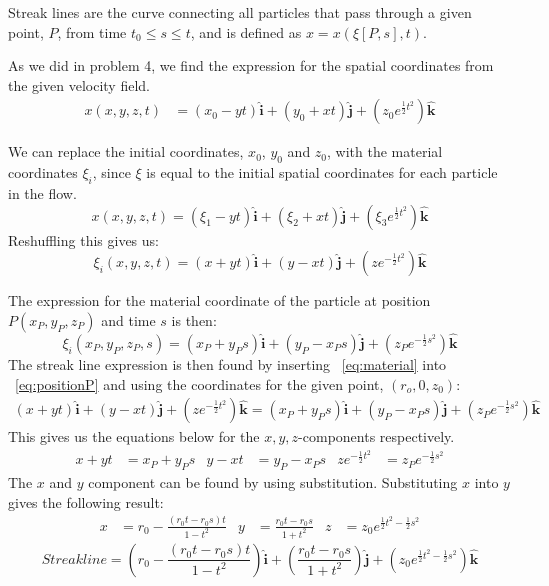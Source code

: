 \documentclass[11pt,a4paper,english]{article}
\numberwithin{equation}{section}
\let\oldhat\hat
\renewcommand{\hat}[1]{\mathbf{\oldhat{#1}}}
\begin{document}
Streak lines are the curve connecting all particles that pass through a given point, $P$, from time $t_0 \leq s \leq t$, and is defined as $x = x(\xi[P,s],t)$.

As we did in problem 4, we find the expression for the spatial coordinates from the given velocity field.
\begin{align*}
	x(x,y,z, t) &= (x_0-yt)\hat{i} + (y_0+xt)\hat{j} + (z_0e^{\frac{1}{2}t^2})\hat{k}
\end{align*}


We can replace the initial coordinates, $x_0$, $y_0$ and $z_0$, with the material coordinates $\xi_i$, since $\xi$ is equal to the initial spatial coordinates for each particle in the flow.
$$x(x,y,z, t) = (\xi_1-yt)\hat{i} + (\xi_2+xt)\hat{j} + (\xi_3e^{\frac{1}{2}t^2})\hat{k}$$
Reshuffling this gives us:
\begin{equation} \label{eq:material}
\xi_i(x,y,z,t) = (x+yt)\hat{i} + (y-xt)\hat{j} + (ze^{-\frac{1}{2}t^2})\hat{k}
\end{equation}

The expression for the material coordinate of the particle at position $P(x_P,y_P,z_P)$ and time $s$ is then:
\begin{equation} \label{eq:positionP}
\xi_i(x_P,y_P,z_P,s) = (x_P+y_Ps)\hat{i} + (y_P-x_Ps)\hat{j} + (z_Pe^{-\frac{1}{2}s^2})\hat{k}
\end{equation}
The streak line expression is then found by inserting ~\eqref{eq:material} into ~\eqref{eq:positionP} and using the coordinates for the given point, $(r_o, 0, z_0)$:
\begin{align*}
	(x+yt)\hat{i} + (y-xt)\hat{j} + (ze^{-\frac{1}{2}t^2})\hat{k}
		= 
	(x_P+y_Ps)\hat{i} + (y_P-x_Ps)\hat{j} + (z_Pe^{-\frac{1}{2}s^2})\hat{k}
\end{align*}
This gives us the equations below for the $x, y, z$-components respectively.
\begin{align*}
	x+yt &= x_P+y_Ps 			& 	
	y-xt &= y_P-x_Ps			&	
	ze^{-\frac{1}{2}t^2} &= z_Pe^{-\frac{1}{2}s^2}
\end{align*}
The $x$ and $y$ component can be found by using substitution. Substituting $x$ into $y$ gives the following result:
\begin{align*}
	x &= r_0 -\frac{(r_0t - r_0s)t}{1-t^2} 	& 	
	y &= \frac{r_0t-r_0s}{1+t^2}				&	
	z &= z_0e^{\frac{1}{2}t^2 - \frac{1}{2}s^2}
\end{align*}
$$ Streak line = (r_0 -\frac{(r_0t - r_0s)t}{1-t^2})\hat{i} + (\frac{r_0t-r_0s}{1+t^2})\hat{j} + (z_0e^{\frac{1}{2}t^2 - \frac{1}{2}s^2})\hat{k} $$
\end{document}
